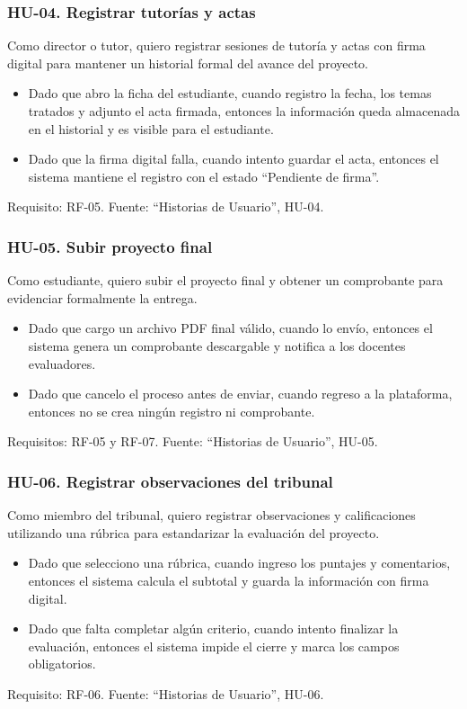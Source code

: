 \subsubsection*{HU-04. Registrar tutorías y actas}
Como director o tutor, quiero registrar sesiones de tutoría y actas con firma digital para mantener un historial formal del avance del proyecto.
\begin{itemize}
  \item Dado que abro la ficha del estudiante, cuando registro la fecha, los temas tratados y adjunto el acta firmada, entonces la información queda almacenada en el historial y es visible para el estudiante.
  \item Dado que la firma digital falla, cuando intento guardar el acta, entonces el sistema mantiene el registro con el estado \enquote{Pendiente de firma}.
\end{itemize}
Requisito: RF-05. Fuente: \enquote{Historias de Usuario}, HU-04.

\subsubsection*{HU-05. Subir proyecto final}
Como estudiante, quiero subir el proyecto final y obtener un comprobante para evidenciar formalmente la entrega.
\begin{itemize}
  \item Dado que cargo un archivo PDF final válido, cuando lo envío, entonces el sistema genera un comprobante descargable y notifica a los docentes evaluadores.
  \item Dado que cancelo el proceso antes de enviar, cuando regreso a la plataforma, entonces no se crea ningún registro ni comprobante.
\end{itemize}
Requisitos: RF-05 y RF-07. Fuente: \enquote{Historias de Usuario}, HU-05.

\subsubsection*{HU-06. Registrar observaciones del tribunal}
Como miembro del tribunal, quiero registrar observaciones y calificaciones utilizando una rúbrica para estandarizar la evaluación del proyecto.
\begin{itemize}
  \item Dado que selecciono una rúbrica, cuando ingreso los puntajes y comentarios, entonces el sistema calcula el subtotal y guarda la información con firma digital.
  \item Dado que falta completar algún criterio, cuando intento finalizar la evaluación, entonces el sistema impide el cierre y marca los campos obligatorios.
\end{itemize}
Requisito: RF-06. Fuente: \enquote{Historias de Usuario}, HU-06.

